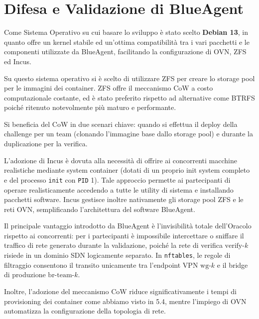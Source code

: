 \section{Difesa e Validazione di
BlueAgent}\label{difesa-e-validazione-di-blueagent}

Come Sistema Operativo su cui basare lo sviluppo è stato scelto
\textbf{Debian 13}, in quanto offre un kernel stabile ed un'ottima
compatibilità tra i vari pacchetti e le componenti utilizzate da
BlueAgent, facilitando la configurazione di OVN, ZFS ed Incus.

Su questo sistema operativo si è scelto di utilizzare ZFS per creare lo
storage pool per le immagini dei container. ZFS offre il meccanismo CoW
a costo computazionale costante, ed è stato preferito rispetto ad
alternative come BTRFS poiché ritenuto notevolmente più maturo e
performante.

Si beneficia del CoW in due scenari chiave: quando si effettua il deploy
della challenge per un team (clonando l'immagine base dallo storage
pool) e durante la duplicazione per la verifica.

L'adozione di Incus è dovuta alla necessità di offrire ai concorrenti
macchine realistiche mediante system container (dotati di un proprio
init system completo e del processo \passthrough{\lstinline!init!} con
\passthrough{\lstinline!PID!} 1). Tale approccio permette ai
partecipanti di operare realisticamente accedendo a tutte le utility di
sistema e installando pacchetti software. Incus gestisce inoltre
nativamente gli storage pool ZFS e le reti OVN, semplificando
l'architettura del software BlueAgent.

Il principale vantaggio introdotto da BlueAgent è l'invisibilità totale
dell'Oracolo rispetto ai concorrenti: per i partecipanti è impossibile
intercettare o sniffare il traffico di rete generato durante la
validazione, poiché la rete di verifica \(\text{verify-}k\) risiede in
un dominio SDN logicamente separato. In
\passthrough{\lstinline!nftables!}, le regole di filtraggio consentono
il transito unicamente tra l'endpoint VPN \(\text{wg-}k\) e il bridge di
produzione \(\text{br-team-}k\).

Inoltre, l'adozione del meccanismo CoW riduce significativamente i tempi
di provisioning dei container come abbiamo visto in 5.4, mentre
l'impiego di OVN automatizza la configurazione della topologia di rete.

